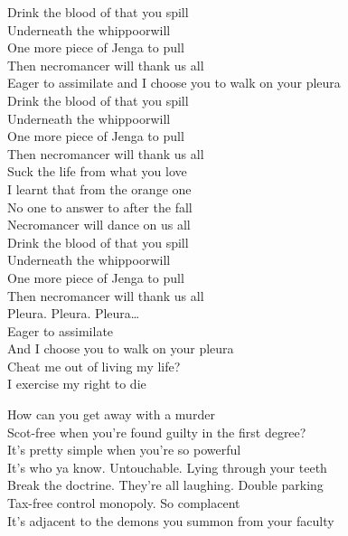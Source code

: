 Drink the blood of that you spill \\
Underneath the whippoorwill \\
One more piece of Jenga to pull \\
Then necromancer will thank us all \\

Eager to assimilate and I choose you to walk on your pleura \\

Drink the blood of that you spill \\
Underneath the whippoorwill \\
One more piece of Jenga to pull \\
Then necromancer will thank us all \\
Suck the life from what you love \\
I learnt that from the orange one \\
No one to answer to after the fall \\
Necromancer will dance on us all \\
Drink the blood of that you spill \\
Underneath the whippoorwill \\
One more piece of Jenga to pull \\
Then necromancer will thank us all \\

Pleura. Pleura. Pleura… \\

Eager to assimilate \\
And I choose you to walk on your pleura \\
Cheat me out of living my life? \\
I exercise my right to die \\




How can you get away with a murder \\
Scot-free when you're found guilty in the first degree? \\
It's pretty simple when you're so powerful \\
It's who ya know. Untouchable. Lying through your teeth \\
Break the doctrine. They're all laughing. Double parking \\
Tax-free control monopoly. So complacent \\
It's adjacent to the demons you summon from your faculty \\

